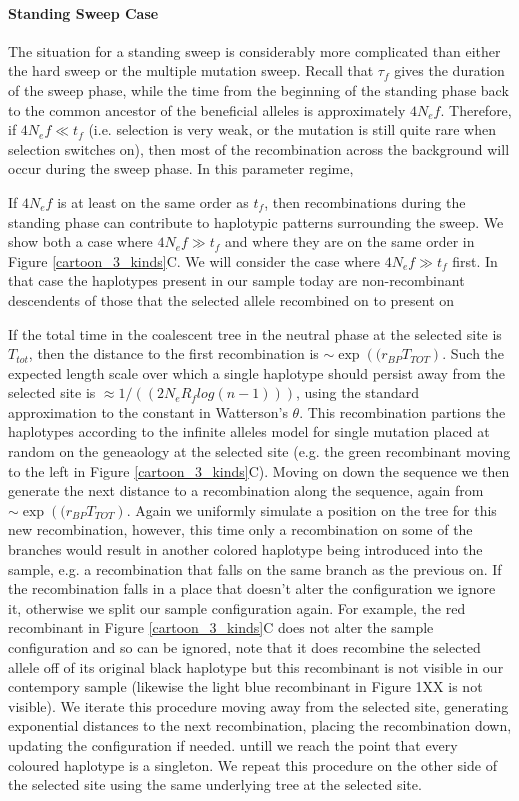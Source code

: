 \documentclass[a4paper,10pt]{article}
\begin{document}
\paragraph{Standing Sweep Case}
The situation for a standing sweep is considerably more complicated than either the hard sweep or the multiple mutation sweep. Recall that $\tau_{f}$ gives the duration of the sweep phase, while the time from the beginning of the standing phase back to the common ancestor of the beneficial alleles is approximately $4N_e f$. Therefore, if $4N_e f \ll t_f$ (i.e. selection is very weak, or the mutation is still quite rare when selection switches on), then most of the recombination across the background will occur during the sweep phase. In this parameter regime, 

If $4N_e f$ is at least on the same order as $t_f$, then recombinations during the standing phase can contribute to haplotypic patterns surrounding the sweep. We show both a case where $4N_e f \gg t_f$ and where they are on the same order in Figure \ref{cartoon_3_kinds}C. We will consider the case where $4N_e f \gg t_f$ first. In that case the haplotypes present in our sample today are non-recombinant descendents of those that the selected allele recombined on to present on 

If the total time in the coalescent tree in the neutral phase at the selected site is $T_{tot}$, then the distance to the first recombination is $\sim \exp \left( (r_{BP} T_{TOT} \right)$. Such the expected length scale over which a single haplotype should persist away from the selected site is $\approx 1/( (2 N_e R_f log(n-1)))$, using the standard approximation to the constant in Watterson's $\theta$. This recombination partions the haplotypes according to the infinite alleles model for single mutation placed at random on the geneaology at the selected site (e.g. the green recombinant moving to the left in Figure \ref{cartoon_3_kinds}C). Moving on down the sequence we then generate the next distance to a recombination along the sequence, again from $\sim \exp \left( (r_{BP} T_{TOT} \right)$. Again we uniformly simulate a position on the tree for this new recombination, however, this time only a recombination on some of the branches would result in another colored haplotype being introduced into the sample, e.g. a recombination that falls on the same branch as the previous on. If the recombination falls in a place that doesn't alter the configuration we ignore it, otherwise we split our sample configuration again. For example, the red recombinant in Figure \ref{cartoon_3_kinds}C does not alter the sample configuration and so can be ignored, note that it does recombine the selected allele off of its original black haplotype but this recombinant is not visible in our contempory sample (likewise the light blue recombinant in Figure 1XX is not visible). We iterate this procedure moving away from the selected site, generating exponential distances to the next recombination, placing the recombination down, updating the configuration if needed. untill we reach the point that every coloured haplotype is a singleton. We repeat this procedure on the other side of the selected site using the same underlying tree at the selected site. 
\end{document}
